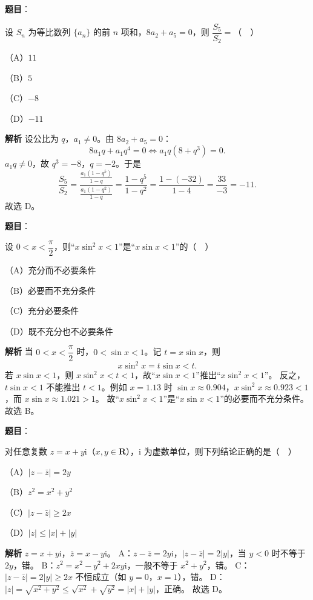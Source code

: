 \begin{answer}

\textbf{题目}：

设 $S_n$ 为等比数列 $\{a_n\}$ 的前 $n$ 项和，$8a_2+a_5=0$，则 $\dfrac{S_5}{S_2}=$（　）

（A）$11$

（B）$5$

（C）$-8$

（D）$-11$

\textbf{解析}
设公比为 $q$，$a_1\neq0$。由 $8a_2+a_5=0$：
\nopagebreak[4]
\[8a_1q+a_1q^4=0\iff a_1q(8+q^3)=0.\]
$a_1q\neq0$，故 $q^3=-8$，$q=-2$。于是
\nopagebreak[4]
\[\frac{S_5}{S_2}=\frac{\frac{a_1(1-q^5)}{1-q}}{\frac{a_1(1-q^2)}{1-q}}
=\frac{1-q^5}{1-q^2}
=\frac{1-(-32)}{1-4}=\frac{33}{-3}=-11.\]
故选 D。


\end{answer}
\begin{answer}

\textbf{题目}：

设 $0<x<\dfrac{\pi}{2}$，则“$x\sin^2x<1$”是“$x\sin x<1$”的（　）

（A）充分而不必要条件

（B）必要而不充分条件

（C）充分必要条件

（D）既不充分也不必要条件

\textbf{解析}
当 $0<x<\dfrac\pi2$ 时，$0<\sin x<1$。记 $t=x\sin x$，则
\nopagebreak[4]
\[x\sin^2x=t\sin x<t.\]
若 $x\sin x<1$，则 $x\sin^2x<t<1$，故“$x\sin x<1$”推出“$x\sin^2x<1$”。
反之，$t\sin x<1$ 不能推出 $t<1$。例如 $x=1.13$ 时 $\sin x\approx0.904$，$x\sin^2x\approx0.923<1$，而 $x\sin x\approx1.021>1$。
故“$x\sin^2x<1$”是“$x\sin x<1$”的必要而不充分条件。
故选 B。


\end{answer}
\begin{answer}

\textbf{题目}：

对任意复数 $z=x+y\mathrm i$（$x,y\in\mathbf R$），$\mathrm i$ 为虚数单位，则下列结论正确的是（　）

（A）$|z-\bar z|=2y$

（B）$z^2=x^2+y^2$

（C）$|z-\bar z|\geqslant 2x$

（D）$|z|\leqslant |x|+|y|$

\textbf{解析}
$z=x+y\mathrm i$，$\bar z=x-y\mathrm i$。
A：$z-\bar z=2y\mathrm i$，$|z-\bar z|=2|y|$，当 $y<0$ 时不等于 $2y$，错。
B：$z^2=x^2-y^2+2xy\mathrm i$，一般不等于 $x^2+y^2$，错。
C：$|z-\bar z|=2|y|\geqslant2x$ 不恒成立（如 $y=0$，$x=1$），错。
D：$|z|=\sqrt{x^2+y^2}\leqslant\sqrt{x^2}+\sqrt{y^2}=|x|+|y|$，正确。
故选 D。


\end{answer}
